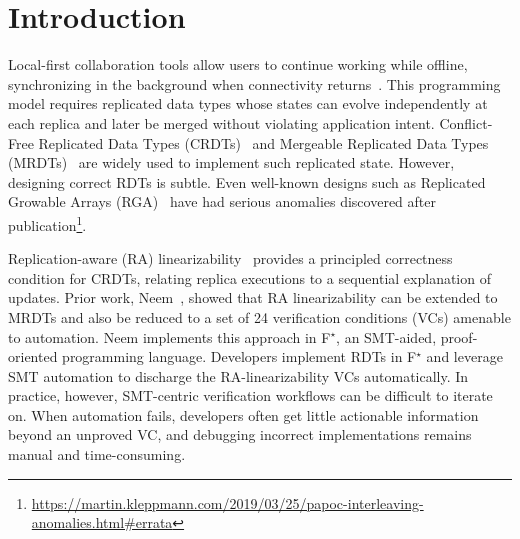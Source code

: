 \documentclass[sigplan,twocolumn,accept]{acmart}
\newcommand{\fstar}{F$^{\star}$\xspace}
\begin{document}


\maketitle

\section{Introduction}

Local-first collaboration tools allow users to continue working while offline, synchronizing in the background when connectivity returns~\citep{localfirst}. This programming model requires replicated data types whose states can evolve independently at each replica and later be merged without violating application intent. Conflict-Free Replicated Data Types (CRDTs)~\citep{CRDTs} and Mergeable Replicated Data Types (MRDTs)~\cite{MRDT} are widely used to implement such replicated state. However, designing correct RDTs is subtle. Even well-known designs such as Replicated Growable Arrays (RGA)~\cite{kleppmanRGA} have had serious anomalies discovered after publication\footnote{\url{https://martin.kleppmann.com/2019/03/25/papoc-interleaving-anomalies.html\#errata}}.

Replication-aware (RA) linearizability~\cite{WangRALin} provides a principled correctness condition for CRDTs, relating replica executions to a sequential explanation of updates. Prior work, Neem~\cite{Neem}, showed that RA linearizability can be extended to MRDTs and also be reduced to a set of 24 verification conditions (VCs) amenable to automation. Neem implements this approach in \fstar, an SMT-aided, proof-oriented programming language. Developers implement RDTs in \fstar and leverage SMT automation to discharge the RA-linearizability VCs automatically. In practice, however, SMT-centric verification workflows can be difficult to iterate on. When automation fails, developers often get little actionable information beyond an unproved VC, and debugging incorrect implementations remains manual and time-consuming.
\end{document}
